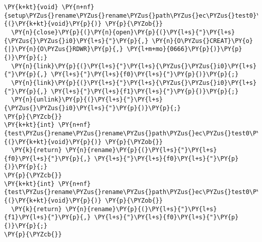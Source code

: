\begin{Verbatim}[commandchars=\\\{\}]
\PY{k+kt}{void} \PY{n+nf}{setup\PYZus{}rename\PYZus{}rename\PYZus{}path\PYZus{}ec\PYZus{}test0}\PY{p}{(}\PY{k+kt}{void}\PY{p}{)} \PY{p}{\PYZob{}}
  \PY{n}{close}\PY{p}{(}\PY{n}{open}\PY{p}{(}\PY{l+s}{"}\PY{l+s}{\PYZus{}\PYZus{}i0}\PY{l+s}{"}\PY{p}{,} \PY{n}{O\PYZus{}CREAT}\PY{o}{|}\PY{n}{O\PYZus{}RDWR}\PY{p}{,} \PY{l+m+mo}{0666}\PY{p}{)}\PY{p}{)}\PY{p}{;}
  \PY{n}{link}\PY{p}{(}\PY{l+s}{"}\PY{l+s}{\PYZus{}\PYZus{}i0}\PY{l+s}{"}\PY{p}{,} \PY{l+s}{"}\PY{l+s}{f0}\PY{l+s}{"}\PY{p}{)}\PY{p}{;}
  \PY{n}{link}\PY{p}{(}\PY{l+s}{"}\PY{l+s}{\PYZus{}\PYZus{}i0}\PY{l+s}{"}\PY{p}{,} \PY{l+s}{"}\PY{l+s}{f1}\PY{l+s}{"}\PY{p}{)}\PY{p}{;}
  \PY{n}{unlink}\PY{p}{(}\PY{l+s}{"}\PY{l+s}{\PYZus{}\PYZus{}i0}\PY{l+s}{"}\PY{p}{)}\PY{p}{;}
\PY{p}{\PYZcb{}}
\PY{k+kt}{int} \PY{n+nf}{test\PYZus{}rename\PYZus{}rename\PYZus{}path\PYZus{}ec\PYZus{}test0\PYZus{}op0}\PY{p}{(}\PY{k+kt}{void}\PY{p}{)} \PY{p}{\PYZob{}}
  \PY{k}{return} \PY{n}{rename}\PY{p}{(}\PY{l+s}{"}\PY{l+s}{f0}\PY{l+s}{"}\PY{p}{,} \PY{l+s}{"}\PY{l+s}{f0}\PY{l+s}{"}\PY{p}{)}\PY{p}{;}
\PY{p}{\PYZcb{}}
\PY{k+kt}{int} \PY{n+nf}{test\PYZus{}rename\PYZus{}rename\PYZus{}path\PYZus{}ec\PYZus{}test0\PYZus{}op1}\PY{p}{(}\PY{k+kt}{void}\PY{p}{)} \PY{p}{\PYZob{}}
  \PY{k}{return} \PY{n}{rename}\PY{p}{(}\PY{l+s}{"}\PY{l+s}{f1}\PY{l+s}{"}\PY{p}{,} \PY{l+s}{"}\PY{l+s}{f0}\PY{l+s}{"}\PY{p}{)}\PY{p}{;}
\PY{p}{\PYZcb{}}
\end{Verbatim}
